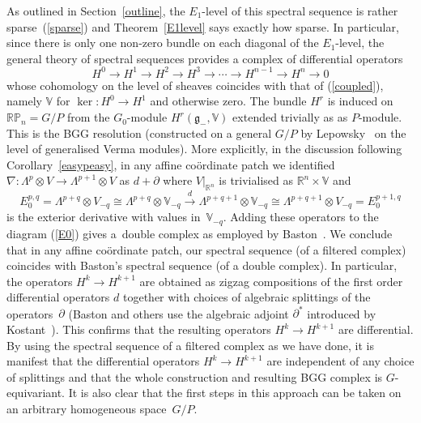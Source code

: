 As outlined in Section~\ref{outline}, the $E_1$-level of this spectral sequence is
rather sparse~(\ref{sparse}) and Theorem~\ref{E1level} says exactly how sparse.
In particular, since there is only one non-zero bundle on each diagonal of the
$E_1$-level, the general theory of spectral sequences provides a complex of
dif\/ferential operators
\[H^0\to H^1\to H^2\to H^3\to\cdots\to H^{n-1}\to H^n\to 0\]
whose cohomology on the level of sheaves coincides with that of
(\ref{coupled}), namely ${\mathbb{V}}$ for $\ker:H^0\to H^1$ and otherwise
zero. The bundle $H^r$ is induced on ${\mathbb{RP}}_n=G/P$ from the
$G_0$-module $H^r({\mathfrak{g}}_-,{\mathbb{V}})$ extended trivially as as
$P$-module. This is the BGG resolution (constructed on a general $G/P$ by
Lepowsky~\cite{l} on the level of generalised Verma modules). More explicitly,
in the discussion following Corollary~\ref{easypeasy}, in any af\/f\/ine
co\"ordinate patch we identif\/ied
$\nabla:\Lambda^p\otimes V\to\Lambda^{p+1}\otimes V$ as $d+\partial$ where
$V|_{{\mathbb{R}}^n}$ is trivialised as ${\mathbb{R}}^n\times{\mathbb{V}}$ and
\[E_0^{p,q}=\Lambda^{p+q}\otimes V_{-q}\cong
\Lambda^{p+q}\otimes{\mathbb{V}}_{-q}\stackrel{d}{\longrightarrow}
\Lambda^{p+q+1}\otimes{\mathbb{V}}_{-q}\cong\Lambda^{p+q+1}\otimes V_{-q}=
E_0^{p+1,q}\]
is the exterior derivative with values in~${\mathbb{V}}_{-q}$. Adding these
operators to the diagram (\ref{E0}) gives a~double complex as employed by
Baston~\cite[p.~120]{b}. We conclude that in any af\/f\/ine co\"ordinate patch, our
spectral sequence (of a f\/iltered complex) coincides with Baston's spectral
sequence (of a double complex). In particular, the operators $H^k\to H^{k+1}$
are obtained as zigzag compositions of the f\/irst order dif\/ferential operators
$d$ together with choices of algebraic splittings of the operators~$\partial$
(Baston and others use the algebraic adjoint $\partial^*$ introduced by
Kostant~\cite{k}). This conf\/irms that the resulting operators $H^k\to H^{k+1}$
are dif\/ferential. By using the spectral sequence of a f\/iltered complex as we
have done, it is manifest that the dif\/ferential operators $H^k\to H^{k+1}$ are
independent of any choice of splittings and that the whole construction and
resulting BGG complex is $G$-equivariant. It is also clear that the f\/irst steps
in this approach can be taken on an arbitrary homogeneous space~$G/P$.

